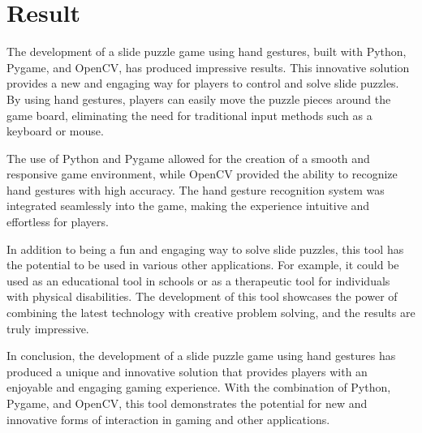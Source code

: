 \chapter{Result} %
\label{cha:chapter 2 label} %
The development of a slide puzzle game using hand gestures, built with Python, Pygame, and OpenCV, has produced impressive results. This innovative solution provides a new and engaging way for players to control and solve slide puzzles. By using hand gestures, players can easily move the puzzle pieces around the game board, eliminating the need for traditional input methods such as a keyboard or mouse.

The use of Python and Pygame allowed for the creation of a smooth and responsive game environment, while OpenCV provided the ability to recognize hand gestures with high accuracy. The hand gesture recognition system was integrated seamlessly into the game, making the experience intuitive and effortless for players.

In addition to being a fun and engaging way to solve slide puzzles, this tool has the potential to be used in various other applications. For example, it could be used as an educational tool in schools or as a therapeutic tool for individuals with physical disabilities. The development of this tool showcases the power of combining the latest technology with creative problem solving, and the results are truly impressive.

In conclusion, the development of a slide puzzle game using hand gestures has produced a unique and innovative solution that provides players with an enjoyable and engaging gaming experience. With the combination of Python, Pygame, and OpenCV, this tool demonstrates the potential for new and innovative forms of interaction in gaming and other applications.